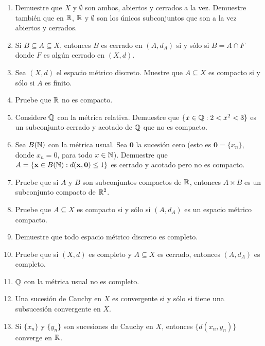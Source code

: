 \begin{enumerate}
    \item Demuestre que $X$ y $\emptyset$ son ambos, abiertos y cerrados a la vez. Demuestre también que en $\mathbb{R}$, $\mathbb{R}$ y $\emptyset$ son los únicos subconjuntos que son a la vez abiertos y cerrados.
    
    \item Si $B \subseteq A \subseteq X$, entonces $B$ es cerrado en $(A, d_A)$ si y sólo si $B = A \cap F$ donde $F$ es algún cerrado en $(X, d)$.

    \item Sea $(X, d)$ el espacio métrico discreto. Muestre que $A \subseteq X$ es compacto si y sólo si $A$ es finito.
    
    \item Pruebe que $\mathbb{R}$ no es compacto.
    
    \item Considere $\mathbb{Q}$ con la métrica relativa. Demuestre que $\{x \in \mathbb{Q} : 2 < x^2 < 3\}$ es un subconjunto cerrado y acotado de $\mathbb{Q}$ que no es compacto.
    
    \item Sea $B(\mathbb{N})$ con la métrica usual. Sea $\mathbf{0}$ la sucesión cero (esto es $\mathbf{0} = \{x_n\}$, donde $x_n = 0$, para todo $x \in \mathbb{N}$). Demuestre que $A = \{\mathbf{x} \in B(\mathbb{N}) : d(\mathbf{x}, \mathbf{0}) \leq 1\}$ es cerrado y acotado pero no es compacto.
    
    \item Pruebe que si $A$ y $B$ son subconjuntos compactos de $\mathbb{R}$, entonces $A \times B$ es un subconjunto compacto de $\mathbb{R}^2$.
    
    \item Pruebe que $A \subseteq X$ es compacto si y sólo si $(A, d_A)$ es un espacio métrico compacto.
    
    \item Demuestre que todo espacio métrico discreto es completo.
    
    \item Pruebe que si $(X, d)$ es completo y $A \subseteq X$ es cerrado, entonces $(A, d_A)$ es completo.
    
    \item $\mathbb{Q}$ con la métrica usual no es completo.
    
    \item Una sucesión de Cauchy en $X$ es convergente si y sólo si tiene una subsucesión convergente en $X$.
    
    \item Si $\{x_n\}$ y $\{y_n\}$ son sucesiones de Cauchy en $X$, entonces $\{d(x_n, y_n)\}$ converge en $\mathbb{R}$.
    

\end{enumerate}
